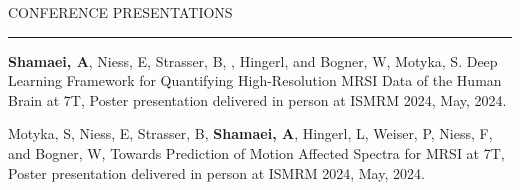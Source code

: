 \documentclass{resume} %
\renewenvironment{rSection}[1]{
\sectionskip
\textcolor{RoyalPurple}{\MakeUppercase{#1}}
\sectionlineskip
\hrule
\begin{list}{}{
\setlength{\leftmargin}{1.5em}
}
\item[]
}{
\end{list}
}
\begin{document}

\begin{rSection}{CONFERENCE PRESENTATIONS}
\begin{rSubsection}{}{}{}{}

\item \textbf{Shamaei, A}, Niess, E, Strasser, B, , Hingerl, and Bogner, W, Motyka, S. Deep Learning Framework for Quantifying High-Resolution MRSI Data of the Human Brain at 7T, Poster presentation delivered in person at ISMRM 2024, May, 2024.

\item Motyka, S, Niess, E, Strasser, B, \textbf{Shamaei, A}, Hingerl, L, Weiser, P,  Niess, F, and Bogner, W, Towards Prediction of Motion Affected Spectra for MRSI at 7T, Poster presentation delivered in person at ISMRM 2024, May, 2024.


\end{rSubsection}
\end{rSection}
\end{document}
